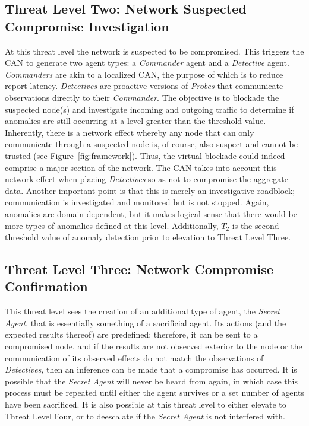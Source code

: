 \documentclass{acm_proc_article-sp}
\begin{document}
\subsection{Threat Level Two: Network Suspected\\Compromise Investigation}
At this threat level the network is suspected to be compromised.  This triggers the CAN to generate two agent types: a {\it Commander} agent and a {\it Detective} agent.  {\it Commanders} are akin to a localized CAN, the purpose of which is to reduce report latency.  {\it Detectives} are proactive versions of {\it Probes} that communicate observations directly to their {\it Commander}.  The objective is to blockade the suspected node(s) and investigate incoming and outgoing traffic to determine if anomalies are still occurring at a level greater than the threshold value.  Inherently, there is a network effect whereby any node that can only communicate through a suspected node is, of course, also suspect and cannot be trusted (see Figure~\ref{fig:framework}).  Thus, the virtual blockade could indeed comprise a major section of the network.  The CAN takes into account this network effect when placing {\it Detectives} so as not to compromise the aggregate data.  Another important point is that this is merely an investigative roadblock; communication is investigated and monitored but is not stopped.  Again, anomalies are domain dependent, but it makes logical sense that there would be more types of anomalies defined at this level.  Additionally, $T_2$ is the second threshold value of anomaly detection prior to elevation to Threat Level Three.

\subsection{Threat Level Three: Network Compromise Confirmation}
This threat level sees the creation of an additional type of agent, the {\it Secret Agent}, that is essentially something of a sacrificial agent.  Its actions (and the expected results thereof) are predefined; therefore, it can be sent to a compromised node, and if the results are not observed exterior to the node or the communication of its observed effects do not match the observations of {\it Detectives}, then an inference can be made that a compromise has occurred.  It is possible that the {\it Secret Agent} will never be heard from again, in which case this process must be repeated until either the agent survives or a set number of agents have been sacrificed.  It is also possible at this threat level to either elevate to Threat Level Four, or to deescalate if the {\it Secret Agent} is not interfered with.
\end{document}
